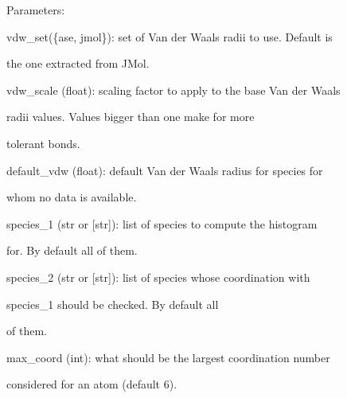 \documentclass[letterpaper,10pt,english]{sphinxmanual}
\begin{document}
\begin{fulllineitems}
\begin{DUlineblock}{0em}
\item[] Parameters:
\item[]
\begin{DUlineblock}{\DUlineblockindent}
\item[] vdw\_set(\{ase, jmol\}): set of Van der Waals radii to use. Default is
\item[]
\begin{DUlineblock}{\DUlineblockindent}
\item[] the one extracted from JMol.
\end{DUlineblock}
\item[] vdw\_scale (float): scaling factor to apply to the base Van der Waals
\item[]
\begin{DUlineblock}{\DUlineblockindent}
\item[] radii values. Values bigger than one make for more
\item[] tolerant bonds.
\end{DUlineblock}
\item[] default\_vdw (float): default Van der Waals radius for species for
\item[]
\begin{DUlineblock}{\DUlineblockindent}
\item[] whom no data is available.
\end{DUlineblock}
\item[] species\_1 (str or {[}str{]}): list of species to compute the histogram
\item[]
\begin{DUlineblock}{\DUlineblockindent}
\item[] for. By default all of them.
\end{DUlineblock}
\item[] species\_2 (str or {[}str{]}): list of species whose coordination with
\item[]
\begin{DUlineblock}{\DUlineblockindent}
\item[] species\_1 should be checked. By default all
\item[] of them.
\end{DUlineblock}
\item[] max\_coord (int): what should be the largest coordination number
\item[]
\begin{DUlineblock}{\DUlineblockindent}
\item[] considered for an atom (default 6).
\end{DUlineblock}
\end{DUlineblock}
\end{DUlineblock}


\end{fulllineitems}
\end{document}
